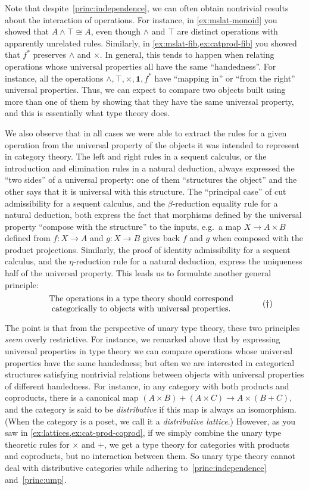 \documentclass{book}
\let\meet\wedge
\def\unit{\mathbf{1}}
\begin{document}
Note that despite~\eqref{princ:independence}, we can often obtain nontrivial results about the interaction of operations.
For instance, in \cref{ex:mslat-monoid} you showed that $A\meet \top\cong A$, even though $\meet$ and $\top$ are distinct operations with apparently unrelated rules.
Similarly, in \cref{ex:mslat-fib,ex:catprod-fib} you showed that $f^*$ preserves $\meet$ and $\times$.
In general, this tends to happen when relating operations whose universal properties all have the same ``handedness''.
For instance, all the operations $\meet,\top,\times,\unit,f^*$ have ``mapping in'' or ``from the right'' universal properties.
Thus, we can expect to compare two objects built using more than one of them by showing that they have the same universal property, and this is essentially what type theory does.

We also observe that in all cases we were able to extract the rules for a given operation from the universal property of the objects it was intended to represent in category theory.
The left and right rules in a sequent calculus, or the introduction and elimination rules in a natural deduction, always expressed the ``two sides'' of a universal property: one of them ``structures the object'' and the other says that it is universal with this structure.
The ``principal case'' of cut admissibility for a sequent calculus, and the $\beta$-reduction equality rule for a natural deduction, both express the fact that morphisms defined by the universal property ``compose with the structure'' to the inputs, e.g.\ a map $X\to A\times B$ defined from $f:X\to A$ and $g:X\to B$ gives back $f$ and $g$ when composed with the product projections.
Similarly, the proof of identity admissibility for a sequent calculus, and the $\eta$-reduction rule for a natural deduction, express the uniqueness half of the universal property.
This leads us to formulate another general principle:
\begin{equation}\label{princ:ump}
  \parbox{3.5in}{\centering The operations in a type theory should correspond categorically to objects with universal properties.}\tag{$\dagger$}
\end{equation}

The point is that from the perspective of unary type theory, these two principles \emph{seem} overly restrictive.
For instance, we remarked above that by expressing universal properties in type theory we can compare operations whose universal properties have the same handedness; but often we are interested in categorical structures satisfying nontrivial relations between objects with universal properties of different handedness.
For instance, in any category with both products and coproducts, there is a canonical map $(A\times B)+(A\times C) \to A\times (B+C)$, and the category is said to be \emph{distributive} if this map is always an isomorphism.
(When the category is a poset, we call it a \emph{distributive lattice}.)
However, as you saw in \cref{ex:lattices,ex:cat-prod-coprod}, if we simply combine the unary type theoretic rules for $\times$ and $+$, we get a type theory for categories with products and coproducts, but no interaction between them.
So unary type theory cannot deal with distributive categories while adhering to~\eqref{princ:independence} and~\eqref{princ:ump}.
\end{document}
